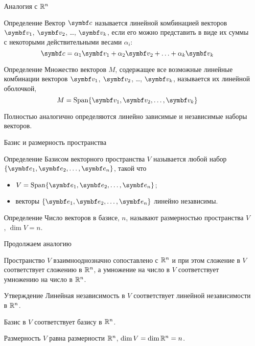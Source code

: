 \begin{frame}{Аналогия с $\mathbb{R}^n$}

\begin{block}{Определение} 
Вектор $\bc$ называется \alert{линейной комбинацией} векторов $\bv_1$, $\bv_2$, \ldots, $\bv_k$, 
если его можно представить в виде их суммы с некоторыми действительными весами $\alpha_i$:
\[
  \bc = \alpha_1 \bv_1 + \alpha_2 \bv_2 + \ldots + \alpha_k \bv_k
\]
\end{block}

\pause
\begin{block}{Определение} 
Множество векторов $M$, содержащее все возможные линейные комбинации векторов $\bv_1$, 
$\bv_2$, \ldots, $\bv_k$, называется их \alert{линейной оболочкой},
\[
  M = \Span\{ \bv_1, \bv_2, \ldots, \bv_k \}
\]
\end{block}
    
\pause 
Полностью аналогично определяются линейно зависимые и независимые наборы векторов. 

\end{frame}


\begin{frame}{Базис и размерность пространства}

\begin{block}{Определение}
\alert{Базисом векторного пространства} $V$ называется любой набор $\{\be_1, \be_2, \ldots, \be_n\}$,
такой что 
\begin{itemize}
    \item $V = \Span \{\be_1, \be_2, \ldots, \be_n\}$;
    \item векторы $\{\be_1, \be_2, \ldots, \be_n\}$ линейно независимы. 
\end{itemize}
\end{block}

\pause
\begin{block}{Определение}
Число  векторов в базисе, $n$, называют \alert{размерностью пространства} $V$, $\dim V = n$.
\end{block}

\end{frame}


\begin{frame}{Продолжаем аналогию}



Пространство $V$ взаимнооднозначно сопоставлено с $\mathbb{R}^n$ и при этом сложение в $V$ 
соответствует сложению в $\mathbb{R}^n$, 
а умножение на число в $V$ соответствует умножению на число в $\mathbb{R}^n$.
 


\begin{block}{Утверждение}
Линейная независимость в $V$ соответствует линейной независимости в $\mathbb{R}^n$.

Базис в $V$ соответствует базису в $\mathbb{R}^n$.

Размерность $V$ равна размерности $\mathbb{R}^n$, $\dim V = \dim \mathbb{R}^n = n$. 
\end{block}


\end{frame}




